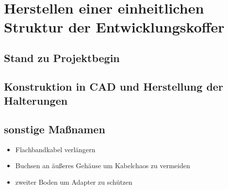 \clearpage
\chapter{\textbf{Herstellen einer einheitlichen Struktur der Entwicklungskoffer}}\label{Entwicklungskoffer gebaut}

\section{Stand zu Projektbegin}

\section{Konstruktion in CAD und Herstellung der Halterungen}

\section{sonstige Maßnamen}
\begin{itemize}
	\item Flachbandkabel verlängern
	\item Buchsen an äußeres Gehäuse um Kabelchaos zu vermeiden 
	\item zweiter Boden um Adapter zu schützen 
\end{itemize}

